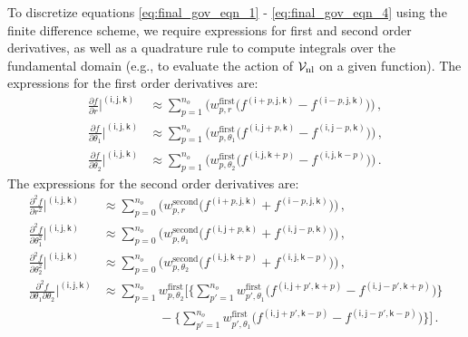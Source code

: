 \documentclass[preprint,12pt, 3p, sort&compress]{elsarticle}
\begin{document}
To discretize equations \ref{eq:final_gov_eqn_1} - \ref{eq:final_gov_eqn_4} using the finite difference scheme, we require expressions for first and second order derivatives, as well as a quadrature rule to compute integrals over the fundamental domain (e.g., to evaluate the action of ${\cal V}_{\text{nl}}$ on a given function). The expressions for the first order derivatives are:
 \begin{align}
\frac{\partial f}{\partial r} \bigg|^{(\mathsf{i},\mathsf{j},\mathsf{k})} &\approx  \sum_{p=1}^{n_o} \bigg({w}_{p,r}^{\text{first}}  \big( f^{(\mathsf{i}+p,\mathsf{j},\mathsf{k})} - f^{(\mathsf{i}-p,\mathsf{j},\mathsf{k})}\big) \bigg)\,,\nonumber \\
\frac{\partial f}{\partial \theta_1} \bigg|^{(\mathsf{i},\mathsf{j},\mathsf{k})} &\approx  \sum_{p=1}^{n_o} \bigg(  {w}_{p,\theta_1}^{\text{first}} \big( f^{(\mathsf{i},\mathsf{j}+p,\mathsf{k})} - f^{(\mathsf{i},\mathsf{j}-p,\mathsf{k})}\big) \bigg)\,,\nonumber \\
\frac{\partial f}{\partial \theta_2} \bigg|^{(\mathsf{i},\mathsf{j},\mathsf{k})} &\approx \sum_{p=1}^{n_o} \bigg({w}_{p,\theta_2}^{\text{first}} \big( f^{(\mathsf{i},\mathsf{j},\mathsf{k}+p)} - f^{(\mathsf{i},\mathsf{j},\mathsf{k}-p)}\big) \bigg)\,.
\label{eq:FD_expressions}
\end{align}
The expressions for the second order derivatives are:
\begin{align}
\nonumber 
\frac{\partial^2 f}{\partial r^2} \bigg|^{(\mathsf{i},\mathsf{j},\mathsf{k})} &\approx  \sum_{p=0}^{n_o} \bigg({w}_{p,r}^{\text{second}}  \big( f^{(\mathsf{i}+p,\mathsf{j},\mathsf{k})} + f^{(\mathsf{i}-p,\mathsf{j},\mathsf{k})}\big) \bigg) \,,  \\\nonumber 
\frac{\partial^2 f}{\partial \theta_1^2} \bigg|^{(\mathsf{i},\mathsf{j},\mathsf{k})} &\approx  \sum_{p=0}^{n_o} \bigg(  {w}_{p,\theta_1}^{\text{second}} \big( f^{(\mathsf{i},\mathsf{j}+p,\mathsf{k})} + f^{(\mathsf{i},\mathsf{j}-p,\mathsf{k})}\big) \bigg) \,, \\\nonumber 
\frac{\partial^2 f}{\partial \theta_2^2} \bigg|^{(\mathsf{i},\mathsf{j},\mathsf{k})} &\approx \sum_{p=0}^{n_o} \bigg({w}_{p,\theta_2}^{\text{second}} \big( f^{(\mathsf{i},\mathsf{j},\mathsf{k}+p)} + f^{(\mathsf{i},\mathsf{j},\mathsf{k}-p)}\big) \bigg) \,,\\\nonumber 
\frac{\partial^2 f}{\partial \theta_1\partial\theta_2} \bigg|^{(\mathsf{i},\mathsf{j},\mathsf{k})} &\approx
\sum_{p=1}^{n_o} {w}_{p,\theta_2}^{\text{first}} \bigg[ 
\bigg\{ \sum_{p'=1}^{n_o} {w}_{p',\theta_1}^{\text{first}} \big( f^{(\mathsf{i},\mathsf{j}+p',\mathsf{k}+p)} - f^{(\mathsf{i},\mathsf{j}-p',\mathsf{k}+p)}\big) \bigg\}\\
&\quad\quad\quad\quad\;\,- \bigg\{ \sum_{p'=1}^{n_o} {w}_{p',\theta_1}^{\text{first}} \big( f^{(\mathsf{i},\mathsf{j}+p',\mathsf{k}-p)} - f^{(\mathsf{i},\mathsf{j}-p',\mathsf{k}-p)}\big)\bigg\}\bigg]\,.
\label{eq:FD_second_derivatives}
\end{align}
\end{document}
